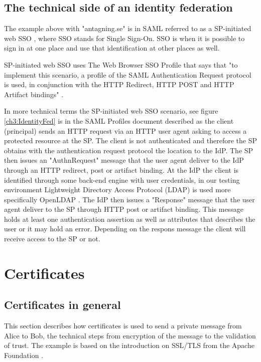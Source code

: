 \subsection{The technical side of an identity federation}
The example above with "antagning.se" is in SAML referred to as a SP-initiated web SSO  \cite[p.~12]{pdf:oasis-open}, 
where SSO stands for Single Sign-On. SSO is when it is possible to sign in at one place and use that identification at other places as well. 

SP-initiated web SSO uses The Web Browser SSO Profile that says that "to implement this scenario,
a profile of the SAML Authentication Request protocol is used, in conjunction with the HTTP Redirect, HTTP POST and
HTTP Artifact bindings" \cite[p.~14]{pdf:oasis-open-profiles}.

In more technical terms the SP-initiated web SSO scenario, see figure \ref{ch3:IdentityFed} 
is in the SAML Profiles document \cite[p.~15]{pdf:oasis-open-profiles} described 
as the client (principal) sends an HTTP request via an HTTP user agent asking to access a protected 
resource at the SP. The client is not authenticated and therefore the SP
obtains with the authentication request protocol the location to the IdP. The SP then issues an "AuthnRequest" message
that the user agent deliver to the IdP through an HTTP redirect, post or artifact binding.
At the IdP the client is identified through some back-end engine with user credentials, in
our testing environment Lightweight Directory Access Protocol (LDAP) is used more specifically OpenLDAP \cite{website:openldap}.
The IdP then issues a "Response" message that the user agent deliver to the SP through HTTP post or artifact binding.
This message holds at least one authentication assertion as well as attributes that describes the user or it may hold an error.
Depending on the respons message the client will receive access to the SP or not.
\section{Certificates}
\subsection{Certificates in general}

This section describes how certificates is used to send a private message from Alice to Bob, the technical steps from encryption 
of the message to the validation of trust.
The example is based on the introduction on SSL/TLS from the Apache Foundation \cite{website:ssl_intro}.

